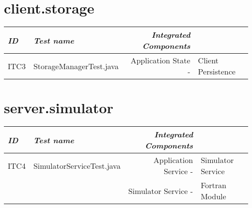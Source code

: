 \section{client.storage}
\begin{tabular}{llrl}
\emph{ID} & \emph{Test name} & \emph{Integrated Components} & \\
\hline
ITC3 & StorageManagerTest.java & Application State - & Client Persistence \\
\end{tabular}


\section{server.simulator}
\begin{tabular}{llrl}
\emph{ID} & \emph{Test name} & \emph{Integrated Components} & \\
\hline
ITC4 & SimulatorServiceTest.java & Application Service - & Simulator Service \\
& & Simulator Service - & Fortran Module\\
\end{tabular}



%
%
%
%
%


